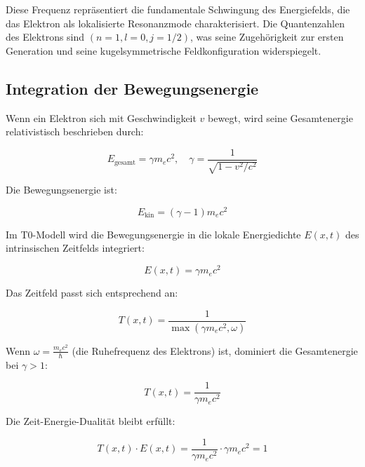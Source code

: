 \documentclass[12pt,a4paper]{article}
\begin{document}
	Diese Frequenz repräsentiert die fundamentale Schwingung des Energiefelds, die das Elektron als lokalisierte Resonanzmode charakterisiert. Die Quantenzahlen des Elektrons sind \((n=1, l=0, j=1/2)\), was seine Zugehörigkeit zur ersten Generation und seine kugelsymmetrische Feldkonfiguration widerspiegelt.
	
	\subsection{Integration der Bewegungsenergie}
	\label{subsec:electron_kinetic}
	
	Wenn ein Elektron sich mit Geschwindigkeit \( v \) bewegt, wird seine Gesamtenergie relativistisch beschrieben durch:
	
	\begin{equation}
		E_{\text{gesamt}} = \gamma m_e c^2, \quad \gamma = \frac{1}{\sqrt{1 - v^2/c^2}}
	\end{equation}
	
	Die Bewegungsenergie ist:
	
	\begin{equation}
		E_{\text{kin}} = (\gamma - 1) m_e c^2
	\end{equation}
	
	Im T0-Modell wird die Bewegungsenergie in die lokale Energiedichte \( E(x,t) \) des intrinsischen Zeitfelds integriert:
	
	\begin{equation}
		E(x,t) = \gamma m_e c^2
	\end{equation}
	
	Das Zeitfeld passt sich entsprechend an:
	
	\begin{equation}
		T(x,t) = \frac{1}{\max(\gamma m_e c^2, \omega)}
	\end{equation}
	
	Wenn \(\omega = \frac{m_e c^2}{\hbar}\) (die Ruhefrequenz des Elektrons) ist, dominiert die Gesamtenergie bei \(\gamma > 1\):
	
	\begin{equation}
		T(x,t) = \frac{1}{\gamma m_e c^2}
	\end{equation}
	
	Die Zeit-Energie-Dualität bleibt erfüllt:
	
	\begin{equation}
		T(x,t) \cdot E(x,t) = \frac{1}{\gamma m_e c^2} \cdot \gamma m_e c^2 = 1
	\end{equation}
	
\end{document}
